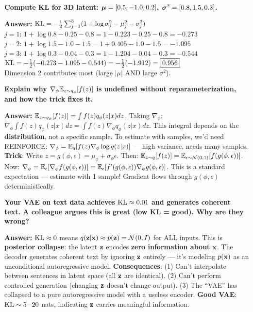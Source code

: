 \begin{examq}
\textbf{Compute KL for 3D latent: $\boldsymbol{\mu} = [0.5, -1.0, 0.2]$, $\boldsymbol{\sigma}^2 = [0.8, 1.5, 0.3]$.}

\textbf{Answer:}
$\text{KL} = -\frac{1}{2}\sum_{j=1}^3 (1 + \log\sigma_j^2 - \mu_j^2 - \sigma_j^2)$\\
$j{=}1$: $1 + \log 0.8 - 0.25 - 0.8 = 1 - 0.223 - 0.25 - 0.8 = -0.273$\\
$j{=}2$: $1 + \log 1.5 - 1.0 - 1.5 = 1 + 0.405 - 1.0 - 1.5 = -1.095$\\
$j{=}3$: $1 + \log 0.3 - 0.04 - 0.3 = 1 - 1.204 - 0.04 - 0.3 = -0.544$\\
$\text{KL} = -\frac{1}{2}(-0.273 - 1.095 - 0.544) = -\frac{1}{2}(-1.912) = \boxed{0.956}$\\
Dimension 2 contributes most (large $|\mu|$ AND large $\sigma^2$).
\end{examq}

\begin{examq}
\textbf{Explain why $\nabla_\phi \mathbb{E}_{z \sim q_\phi}[f(z)]$ is undefined without reparameterization, and how the trick fixes it.}

\textbf{Answer:} $\mathbb{E}_{z \sim q_\phi}[f(z)] = \int f(z)q_\phi(z|x)dz$. Taking $\nabla_\phi$: $\nabla_\phi \int f(z)q_\phi(z|x)dz = \int f(z)\nabla_\phi q_\phi(z|x)dz$. This integral depends on the \textbf{distribution}, not a specific sample. To estimate with samples, we'd need REINFORCE: $\nabla_\phi = \mathbb{E}_q[f(z)\nabla_\phi \log q(z|x)]$ — high variance, needs many samples.
\textbf{Trick}: Write $z = g(\phi, \epsilon) = \mu_\phi + \sigma_\phi \epsilon$. Then: $\mathbb{E}_{z\sim q}[f(z)] = \mathbb{E}_{\epsilon \sim \mathcal{N}(0,1)}[f(g(\phi,\epsilon))]$. Now: $\nabla_\phi = \mathbb{E}_\epsilon[\nabla_\phi f(g(\phi,\epsilon))] = \mathbb{E}_\epsilon[f'(g(\phi,\epsilon))\nabla_\phi g(\phi,\epsilon)]$. This is a standard expectation — estimate with 1 sample! Gradient flows through $g(\phi,\epsilon)$ deterministically.
\end{examq}

\begin{examq}
\textbf{Your VAE on text data achieves $\text{KL} \approx 0.01$ and generates coherent text. A colleague argues this is great (low KL = good). Why are they wrong?}

\textbf{Answer:} $\text{KL} \approx 0$ means $q(\mathbf{z}|\mathbf{x}) \approx p(\mathbf{z}) = \mathcal{N}(0,I)$ for ALL inputs. This is \textbf{posterior collapse}: the latent $\mathbf{z}$ encodes \textbf{zero information about} $\mathbf{x}$. The decoder generates coherent text by ignoring $\mathbf{z}$ entirely — it's modeling $p(\mathbf{x})$ as an unconditional autoregressive model. \textbf{Consequences}: (1) Can't interpolate between sentences in latent space (all $\mathbf{z}$ are identical). (2) Can't perform controlled generation (changing $\mathbf{z}$ doesn't change output). (3) The ``VAE'' has collapsed to a pure autoregressive model with a useless encoder. \textbf{Good VAE}: $\text{KL} \sim 5{-}20$ nats, indicating $\mathbf{z}$ carries meaningful information.
\end{examq}

